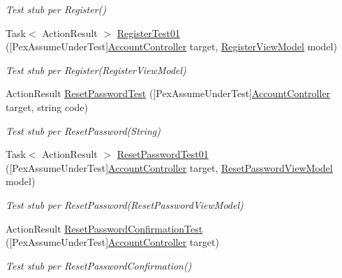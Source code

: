 \begin{DoxyCompactItemize}
\begin{DoxyCompactList}\small\item\em Test stub per Register()\end{DoxyCompactList}\item 
Task$<$ Action\+Result $>$ \mbox{\hyperlink{class_brew_day2_1_1_controllers_1_1_tests_1_1_account_controller_test_ad4730890106ee73a2493bc8c646064f0}{Register\+Test01}} (\mbox{[}Pex\+Assume\+Under\+Test\mbox{]}\mbox{\hyperlink{class_brew_day2_1_1_controllers_1_1_account_controller}{Account\+Controller}} target, \mbox{\hyperlink{class_brew_day2_1_1_models_1_1_register_view_model}{Register\+View\+Model}} model)
\begin{DoxyCompactList}\small\item\em Test stub per Register(\+Register\+View\+Model)\end{DoxyCompactList}\item 
Action\+Result \mbox{\hyperlink{class_brew_day2_1_1_controllers_1_1_tests_1_1_account_controller_test_a3603b1457196babfc3a5e8cf19a94f79}{Reset\+Password\+Test}} (\mbox{[}Pex\+Assume\+Under\+Test\mbox{]}\mbox{\hyperlink{class_brew_day2_1_1_controllers_1_1_account_controller}{Account\+Controller}} target, string code)
\begin{DoxyCompactList}\small\item\em Test stub per Reset\+Password(\+String)\end{DoxyCompactList}\item 
Task$<$ Action\+Result $>$ \mbox{\hyperlink{class_brew_day2_1_1_controllers_1_1_tests_1_1_account_controller_test_a3ee58de91f9c39c42735703a4c4a28be}{Reset\+Password\+Test01}} (\mbox{[}Pex\+Assume\+Under\+Test\mbox{]}\mbox{\hyperlink{class_brew_day2_1_1_controllers_1_1_account_controller}{Account\+Controller}} target, \mbox{\hyperlink{class_brew_day2_1_1_models_1_1_reset_password_view_model}{Reset\+Password\+View\+Model}} model)
\begin{DoxyCompactList}\small\item\em Test stub per Reset\+Password(\+Reset\+Password\+View\+Model)\end{DoxyCompactList}\item 
Action\+Result \mbox{\hyperlink{class_brew_day2_1_1_controllers_1_1_tests_1_1_account_controller_test_a3b0477d8fb3494f77f461458bf761e30}{Reset\+Password\+Confirmation\+Test}} (\mbox{[}Pex\+Assume\+Under\+Test\mbox{]}\mbox{\hyperlink{class_brew_day2_1_1_controllers_1_1_account_controller}{Account\+Controller}} target)
\begin{DoxyCompactList}\small\item\em Test stub per Reset\+Password\+Confirmation()\end{DoxyCompactList}\item 

\end{DoxyCompactItemize}
